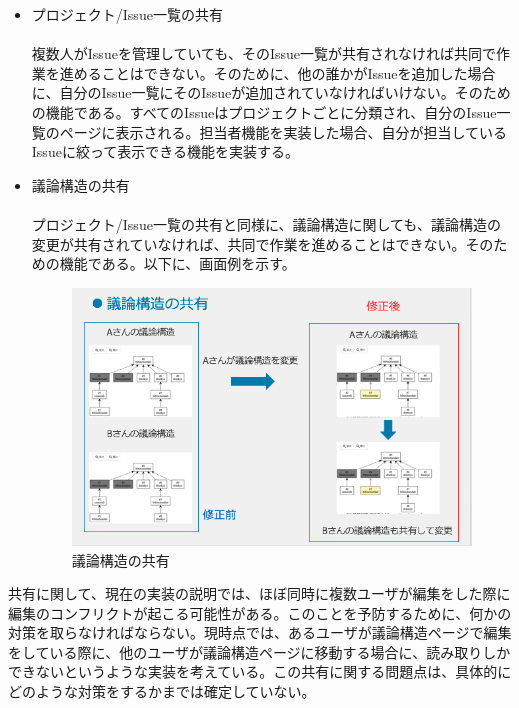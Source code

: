 \documentclass[12pt, oneside]{jreport}
\begin{document}
\begin{itemize}
			\item プロジェクト/Issue一覧の共有
			\\ \\
			複数人がIssueを管理していても、そのIssue一覧が共有されなければ共同で作業を進めることはできない。そのために、他の誰かがIssueを追加した場合に、自分のIssue一覧にそのIssueが追加されていなければいけない。そのための機能である。すべてのIssueはプロジェクトごとに分類され、自分のIssue一覧のページに表示される。担当者機能を実装した場合、自分が担当しているIssueに絞って表示できる機能を実装する。
			

		
			\item 議論構造の共有
			\\ \\
			プロジェクト/Issue一覧の共有と同様に、議論構造に関しても、議論構造の変更が共有されていなければ、共同で作業を進めることはできない。そのための機能である。以下に、画面例を示す。
			
			\begin{figure}[H]
			\centering
			\includegraphics[width=17cm,bb=200 300 -200 27]{GraphShare.png}
			\caption{議論構造の共有}
			\end{figure}
			
		\end{itemize}
		
		共有に関して、現在の実装の説明では、ほぼ同時に複数ユーザが編集をした際に編集のコンフリクトが起こる可能性がある。このことを予防するために、何かの対策を取らなければならない。現時点では、あるユーザが議論構造ページで編集をしている際に、他のユーザが議論構造ページに移動する場合に、読み取りしかできないというような実装を考えている。この共有に関する問題点は、具体的にどのような対策をするかまでは確定していない。
		
\end{document}
